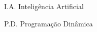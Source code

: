 \begin{siglas}

	\item[I.A.] Inteligência Artificial
	\item[P.D.] Programação Dinâmica

\end{siglas}
